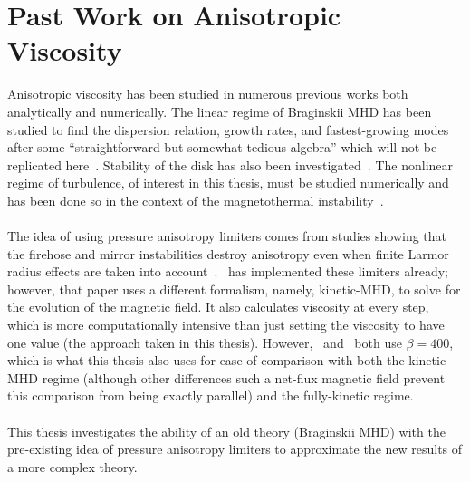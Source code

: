 \section{Past Work on Anisotropic Viscosity}
Anisotropic viscosity has been studied in numerous previous works both analytically and numerically. The linear regime of Braginskii MHD has been studied to find the dispersion relation, growth rates, and fastest-growing modes after some ``straightforward but somewhat tedious algebra'' which will not be replicated here~\cite{Balbus2004,Islam2005}. Stability of the disk has also been investigated~\cite{Quataert2015}. The nonlinear regime of turbulence, of interest in this thesis, must be studied numerically and has been done so in the context of the magnetothermal instability~\cite{Bu2011}.\\
\\
The idea of using pressure anisotropy limiters comes from studies showing that the firehose and mirror instabilities destroy anisotropy even when finite Larmor radius effects are taken into account~\cite{Hellinger2000,Hellinger2007}.~ has implemented these limiters already; however, that paper uses a different formalism, namely, kinetic-MHD, to solve for the evolution of the magnetic field. It also calculates viscosity at every step, which is more computationally intensive than just setting the viscosity to have one value (the approach taken in this thesis). However,~ and~ both use $\beta=400$, which is what this thesis also uses for ease of comparison with both the kinetic-MHD regime (although other differences such a net-flux magnetic field prevent this comparison from being exactly parallel) and the fully-kinetic regime. \\
\\
This thesis investigates the ability of an old theory (Braginskii MHD) with the pre-existing idea of pressure anisotropy limiters to approximate the new results of a more complex theory. 



